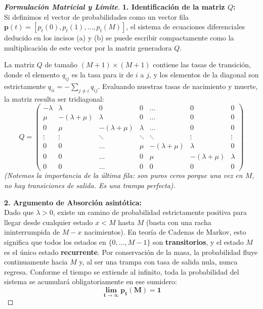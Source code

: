 \documentclass[10pt,a4paper]{article}
\begin{document}
\begin{proof}[\textbf{Formulación Matricial y Límite}]
    \textbf{1. Identificación de la matriz $Q$:} \\
    Si definimos el vector de probabilidades como un vector fila $\mathbf{p}(t) = [p_t(0), p_t(1), \dots, p_t(M)]$, el sistema de ecuaciones diferenciales deducido en los incisos (a) y (b) se puede escribir compactamente como la multiplicación de este vector por la matriz generadora $Q$.
    
    La matriz $Q$ de tamaño $(M+1) \times (M+1)$ contiene las tasas de transición, donde el elemento $q_{ij}$ es la tasa para ir de $i$ a $j$, y los elementos de la diagonal son estrictamente $q_{ii} = -\sum_{j \neq i} q_{ij}$. Evaluando nuestras tasas de nacimiento y muerte, la matriz resulta ser tridiagonal:
    \[
    Q = \begin{pmatrix}
    -\lambda & \lambda & 0 & 0 & \dots & 0 & 0 \\
    \mu & -(\lambda+\mu) & \lambda & 0 & \dots & 0 & 0 \\
    0 & \mu & -(\lambda+\mu) & \lambda & \dots & 0 & 0 \\
    \vdots & \vdots & \ddots & \ddots & \ddots & \vdots & \vdots \\
    0 & 0 & \dots & \mu & -(\lambda+\mu) & \lambda & 0 \\
    0 & 0 & \dots & 0 & \mu & -(\lambda+\mu) & \lambda \\
    0 & 0 & \dots & 0 & 0 & 0 & 0
    \end{pmatrix}
    \]
    \textit{(Notemos la importancia de la última fila: son puros ceros porque una vez en $M$, no hay transiciones de salida. Es una trampa perfecta).}

    \vspace{3mm}
    \textbf{2. Argumento de Absorción asintótica:} \\
    Dado que $\lambda > 0$, existe un camino de probabilidad estrictamente positiva para llegar desde cualquier estado $x < M$ hasta $M$ (basta con una racha ininterrumpida de $M-x$ nacimientos). 
    En teoría de Cadenas de Markov, esto significa que todos los estados en $\{0, \dots, M-1\}$ son \textbf{transitorios}, y el estado $M$ es el único estado \textbf{recurrente}.
    Por conservación de la masa, la probabilidad fluye continuamente hacia $M$ y, al ser una trampa con tasa de salida nula, nunca regresa. Conforme el tiempo se extiende al infinito, toda la probabilidad del sistema se acumulará obligatoriamente en ese sumidero:
    \[ \mathbf{\lim_{t \to \infty} p_t(M) = 1} \]
\end{proof}
\end{document}
